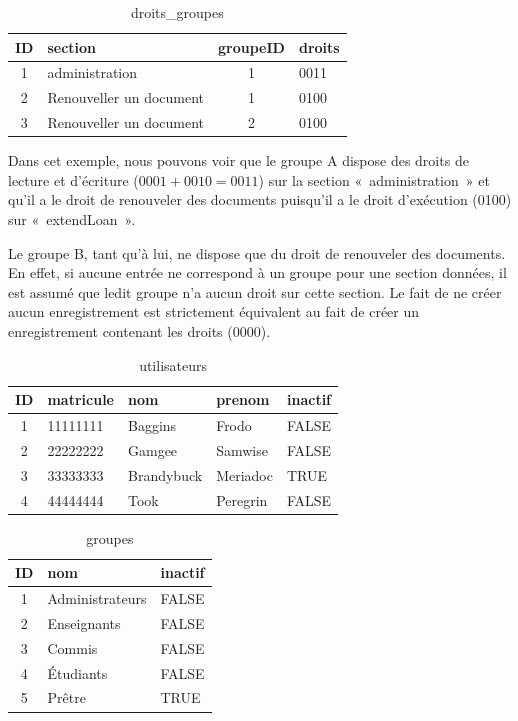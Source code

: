 \documentclass[letter, 10pt]{report}
\begin{document}
\begin{table}[h!]
	\caption{droits\_groupes}
	\begin{center}
		\begin{tabular}{|c|l|c|l|}
			\hline
			ID & section                 & groupeID & droits \\
			\hline
			1  & administration          & 1        & 0011 \\
			2  & Renouveller un document & 1        & 0100 \\
			3  & Renouveller un document & 2        & 0100 \\
			\hline
		\end{tabular}
	\end{center}
\end{table}

Dans cet exemple, nous pouvons voir que le groupe A dispose des droits de lecture et d'écriture ($ 0001 + 0010 = 0011 $) sur la section «~administration~» et qu'il a le droit de renouveler des documents puisqu'il a le droit d'exécution (0100) sur «~extendLoan~».

Le groupe B, tant qu'à lui, ne dispose que du droit de renouveler des documents. En effet, si aucune entrée ne correspond à un groupe pour une section données, il est assumé que ledit groupe n'a aucun droit sur cette section. Le fait de ne créer aucun enregistrement est strictement équivalent au fait de créer un enregistrement contenant les droits (0000).

\begin{table}[h!]
	\caption{utilisateurs}
	\begin{center}
		\begin{tabular}{|c|l|l|l|l|}
			\hline
			ID & matricule & nom         & prenom   & inactif \\
			\hline
			1  & 11111111  & Baggins     & Frodo    & FALSE \\
			2  & 22222222  & Gamgee      & Samwise  & FALSE \\
			3  & 33333333  & Brandybuck  & Meriadoc & TRUE \\
			4  & 44444444  & Took        & Peregrin & FALSE \\
			\hline
		\end{tabular}
	\end{center}
\end{table}

\begin{table}[h!]
	\caption{groupes}
	\begin{center}
		\begin{tabular}{|c|l|l|}
			\hline
			ID & nom               & inactif \\
			\hline
			1  & Administrateurs   & FALSE \\
			2  & Enseignants       & FALSE \\
			3  & Commis            & FALSE \\
			4  & Étudiants         & FALSE \\
			5  & Prêtre            & TRUE \\
			\hline
		\end{tabular}
	\end{center}
\end{table}
\end{document}
